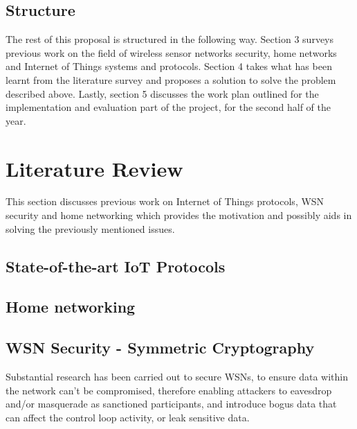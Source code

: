 \documentclass{mprop}
\begin{document}

\subsection{Structure} %
\label{sub:structure}
The rest of this proposal is structured in the following way. Section 3 surveys previous work on the field of wireless sensor networks security, home networks and Internet of Things systems and protocols. Section 4 takes what has been learnt from the literature survey and proposes a solution to solve the problem described above. Lastly, section 5 discusses the work plan outlined for the implementation and evaluation part of the project, for the second half of the year.


\section{Literature Review}
This section discusses previous work on Internet of Things protocols, WSN security and home networking which provides the motivation and possibly aids in solving the previously mentioned issues.

\subsection{State-of-the-art IoT Protocols} %
\label{sub:state_of_the_art_iot_protocols}


\subsection{Home networking} %
\label{sub:homework_smart_home_router}


\subsection{WSN Security - Symmetric Cryptography} %
\label{sub:tinysec_minisec_contikisec}
Substantial research has been carried out to secure WSNs, to ensure data within the network can't be compromised, therefore enabling attackers to eavesdrop and/or masquerade as sanctioned participants, and introduce bogus data that can affect the control loop activity, or leak sensitive data.
\end{document}
